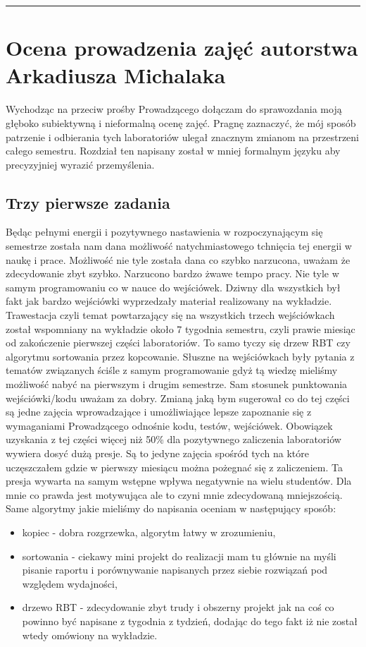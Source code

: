 \documentclass[a4paper,11pt]{article}
\newcommand{\linia}{\rule{\linewidth}{0.4mm}}
\begin{document}
\noindent\linia
\section{Ocena prowadzenia zajęć autorstwa Arkadiusza Michalaka}
Wychodząc na przeciw prośby Prowadzącego dołączam do sprawozdania moją głęboko subiektywną i nieformalną ocenę zajęć. Pragnę zaznaczyć, że mój sposób patrzenie i odbierania tych laboratoriów ulegał znacznym zmianom na przestrzeni całego semestru. Rozdział ten napisany został w mniej formalnym języku aby precyzyjniej wyrazić przemyślenia.
\subsection{Trzy pierwsze zadania}
Będąc pełnymi energii i pozytywnego nastawienia w rozpoczynającym się semestrze została nam dana możliwość natychmiastowego tchnięcia tej energii w naukę i prace. Możliwość nie tyle została dana co szybko narzucona, uważam że zdecydowanie zbyt szybko. Narzucono bardzo żwawe tempo pracy. Nie tyle w samym programowaniu co w nauce do wejściówek. Dziwny dla wszystkich był fakt jak bardzo wejściówki wyprzedzały materiał realizowany na wykładzie. Trawestacja czyli temat powtarzający się na wszystkich trzech wejściówkach został wspomniany na wykładzie około 7 tygodnia semestru, czyli prawie miesiąc od zakończenie pierwszej części laboratoriów. To samo tyczy się drzew RBT czy algorytmu sortowania przez kopcowanie. Słuszne na wejściówkach były pytania z tematów związanych ściśle z samym programowanie gdyż tą wiedzę mieliśmy możliwość nabyć na pierwszym i drugim semestrze. Sam stosunek punktowania wejściówki/kodu uważam za dobry. Zmianą jaką bym sugerował co do tej części są jedne zajęcia wprowadzające i umożliwiające lepsze zapoznanie się z wymaganiami Prowadzącego odnośnie kodu, testów, wejściówek. Obowiązek uzyskania z tej części więcej niż 50\% dla pozytywnego zaliczenia laboratoriów wywiera dosyć dużą presje. Są to jedyne zajęcia spośród tych na które uczęszczałem gdzie w pierwszy miesiącu można pożegnać się z zaliczeniem. Ta presja wywarta na samym wstępne wpływa negatywnie na wielu studentów. Dla mnie co prawda jest motywująca ale to czyni mnie zdecydowaną mniejszością. Same algorytmy jakie mieliśmy do napisania oceniam w następujący sposób:
\begin{itemize}
\item kopiec - dobra rozgrzewka, algorytm łatwy w zrozumieniu,
\item sortowania - ciekawy mini projekt do realizacji mam tu głównie na myśli pisanie raportu i porównywanie napisanych przez siebie rozwiązań pod względem wydajności,
\item drzewo RBT - zdecydowanie zbyt trudy i obszerny projekt jak na coś co powinno być napisane z tygodnia z tydzień, dodając do tego fakt iż nie został wtedy omówiony na wykładzie.
\end{itemize}
\end{document}
